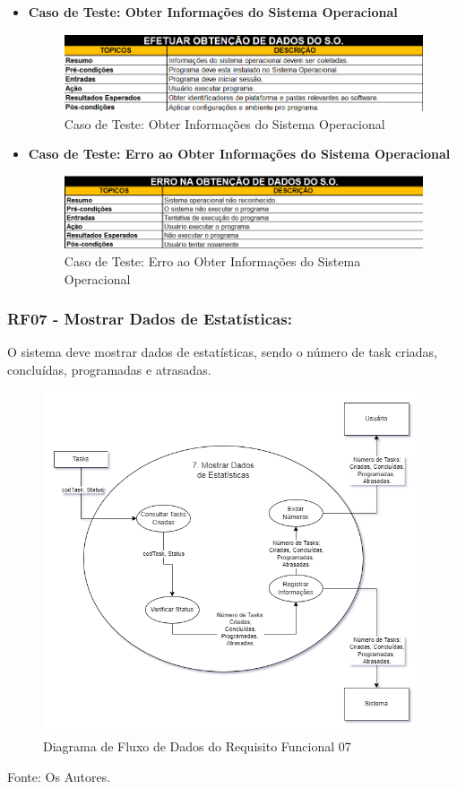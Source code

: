 \documentclass[a4paper,12pt]{article}
\begin{document}
\begin{itemize}
	\item\textbf{Caso de Teste: Obter Informações do Sistema Operacional}
	\begin{figure}
		\centering
		\includegraphics[scale=0.75]{UnitTest/trueCase/getOSInfo.png}
		\caption{Caso de Teste: Obter Informações do Sistema Operacional}
	\end{figure}
	\item\textbf{Caso de Teste: Erro ao Obter Informações do Sistema Operacional}
	\begin{figure}
		\centering
		\includegraphics[scale=0.75]{UnitTest/falseCase/getOSInfo.png}
		\caption{Caso de Teste: Erro ao Obter Informações do Sistema Operacional}
	\end{figure}
\end{itemize}

\pagebreak
\subsubsection{RF07 - Mostrar Dados de Estatísticas:}
O sistema deve mostrar dados de estatísticas, sendo o número de task criadas, concluídas, programadas e atrasadas.
\begin{figure}[H]
	\centering
	\includegraphics[scale=0.45]{DFDs/RF07.drawio.png}
	\caption{Diagrama de Fluxo de Dados do Requisito Funcional 07}
\end{figure}
\noindent Fonte: Os Autores.
\end{document}
